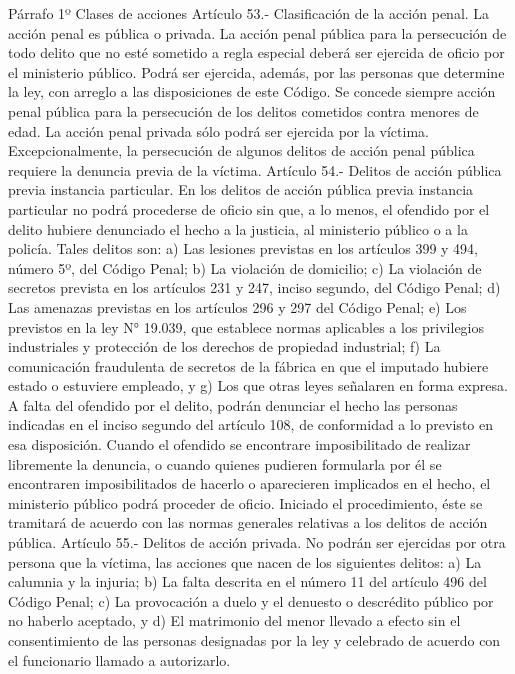     Párrafo 1º Clases de acciones
    Artículo 53.- Clasificación de la acción penal. La acción penal es pública o privada.
    La acción penal pública para la persecución de todo delito que no esté sometido a regla especial deberá ser ejercida de oficio por el ministerio público. Podrá ser ejercida, además, por las personas que determine la ley, con arreglo a las disposiciones de este Código. Se concede siempre acción penal pública para la persecución de los delitos cometidos contra menores de edad.
    La acción penal privada sólo podrá ser ejercida por la víctima.
    Excepcionalmente, la persecución de algunos delitos de acción penal pública requiere la denuncia previa de la víctima.
    Artículo 54.- Delitos de acción pública previa instancia particular. En los delitos de acción pública previa instancia particular no podrá procederse de oficio sin que, a lo menos, el ofendido por el delito hubiere denunciado el hecho a la justicia, al ministerio público o a la policía.
    Tales delitos son:
    a) Las lesiones previstas en los artículos 399 y 494, número 5º, del Código Penal;
    b) La violación de domicilio;
    c) La violación de secretos prevista en los artículos 231 y 247, inciso segundo, del Código Penal;
    d) Las amenazas previstas en los artículos 296 y 297 del Código Penal;
    e) Los previstos en la ley N° 19.039, que establece normas aplicables a los privilegios industriales y protección de los derechos de propiedad industrial;
    f) La comunicación fraudulenta de secretos de la fábrica en que el imputado hubiere estado o estuviere empleado, y
    g) Los que otras leyes señalaren en forma expresa.
    A falta del ofendido por el delito, podrán denunciar el hecho las personas indicadas en el inciso segundo del artículo 108, de conformidad a lo previsto en esa disposición.
    Cuando el ofendido se encontrare imposibilitado de realizar libremente la denuncia, o cuando quienes pudieren formularla por él se encontraren imposibilitados de hacerlo o aparecieren implicados en el hecho, el ministerio público podrá proceder de oficio.
    Iniciado el procedimiento, éste se tramitará de acuerdo con las normas generales relativas a los delitos de acción pública.
    Artículo 55.- Delitos de acción privada. No podrán ser ejercidas por otra persona que la víctima, las acciones que nacen de los siguientes delitos:
    a) La calumnia y la injuria;
    b) La falta descrita en el número 11 del artículo 496 del Código Penal;
    c) La provocación a duelo y el denuesto o descrédito público por no haberlo aceptado, y d) El matrimonio del menor llevado a efecto sin el consentimiento de las personas designadas por la ley y celebrado de acuerdo con el funcionario llamado a autorizarlo.
